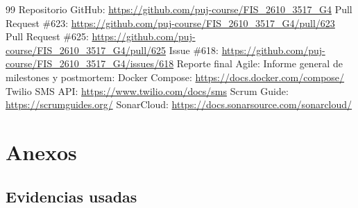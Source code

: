 \documentclass[11pt,a4paper]{article}
\begin{document}
\begin{thebibliography}{99}
 Repositorio GitHub: \url{https://github.com/puj-course/FIS_2610_3517_G4}
 Pull Request \#623: \url{https://github.com/puj-course/FIS_2610_3517_G4/pull/623}
 Pull Request \#625: \url{https://github.com/puj-course/FIS_2610_3517_G4/pull/625}
 Issue \#618: \url{https://github.com/puj-course/FIS_2610_3517_G4/issues/618}
 Reporte final Agile: 
 Informe general de milestones y postmortem: 
 Docker Compose: \url{https://docs.docker.com/compose/}
 Twilio SMS API: \url{https://www.twilio.com/docs/sms}
 Scrum Guide: \url{https://scrumguides.org/}
 SonarCloud: \url{https://docs.sonarsource.com/sonarcloud/}
\end{thebibliography}

\section{Anexos}

\subsection{Evidencias usadas}
\end{document}
